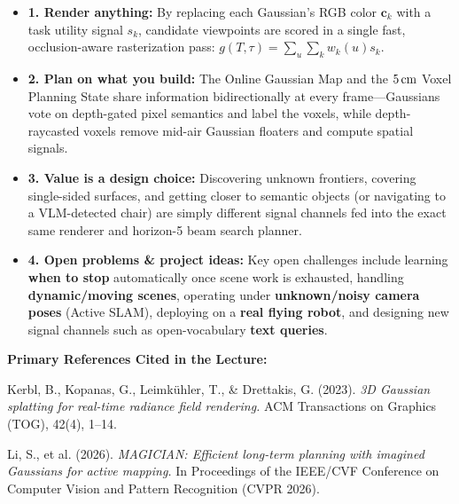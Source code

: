 \documentclass[11pt, a4paper]{article}
\theoremstyle{definition}
\begin{document}
\begin{itemize}[leftmargin=*]
    \item \textbf{1. Render anything:} By replacing each Gaussian's RGB color $\mathbf{c}_k$ with a task utility signal $s_k$, candidate viewpoints are scored in a single fast, occlusion-aware rasterization pass: $g(T, \tau) = \sum_u \sum_k w_k(u) s_k$.
    \item \textbf{2. Plan on what you build:} The Online Gaussian Map and the $5\text{\,cm}$ Voxel Planning State share information bidirectionally at every frame—Gaussians vote on depth-gated pixel semantics and label the voxels, while depth-raycasted voxels remove mid-air Gaussian floaters and compute spatial signals.
    \item \textbf{3. Value is a design choice:} Discovering unknown frontiers, covering single-sided surfaces, and getting closer to semantic objects (or navigating to a VLM-detected chair) are simply different signal channels fed into the exact same renderer and horizon-5 beam search planner.
    \item \textbf{4. Open problems \& project ideas:} Key open challenges include learning \textbf{when to stop} automatically once scene work is exhausted, handling \textbf{dynamic/moving scenes}, operating under \textbf{unknown/noisy camera poses} (Active SLAM), deploying on a \textbf{real flying robot}, and designing new signal channels such as open-vocabulary \textbf{text queries}.
\end{itemize}

\vspace{8pt}
\noindent\textbf{Primary References Cited in the Lecture:}
\begin{enumerate}[leftmargin=*, label={[\arabic*]}]
    \item Kerbl, B., Kopanas, G., Leimk{\"u}hler, T., \& Drettakis, G. (2023). \emph{3D Gaussian splatting for real-time radiance field rendering.} ACM Transactions on Graphics (TOG), 42(4), 1--14.
    \item Li, S., et al. (2026). \emph{MAGICIAN: Efficient long-term planning with imagined Gaussians for active mapping.} In Proceedings of the IEEE/CVF Conference on Computer Vision and Pattern Recognition (CVPR 2026).
\end{enumerate}
\end{document}
